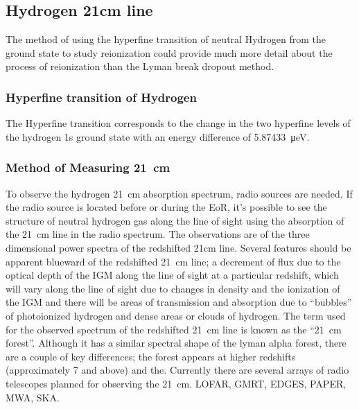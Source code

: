 
    \subsection{Hydrogen 21cm line} %
    \label{sub:Hydrogen_21cm}
        The method of using the hyperfine transition of neutral Hydrogen from the ground state to study reionization could provide much more detail about the process of reionization than the Lyman break dropout method.

         \subsubsection{Hyperfine transition of Hydrogen} %
         \label{subsub:Hyperfine_Hydrogen}
            The Hyperfine transition corresponds to the change in the two hyperfine levels of the hydrogen 1s ground state with an energy difference of \SI{5.87433}{\micro\electronvolt}.

        \subsubsection{Method of Measuring \SI{21}{\centi\metre}} %
    	\label{subsub:Measuring_21cm}
            To observe the hydrogen \SI{21}{\centi\metre} absorption spectrum, radio sources are needed. If the radio source is located before or during the EoR, it's possible to see the structure of neutral hydrogen gas along the line of sight using the absorption of the \SI{21}{\centi\metre} line in the radio spectrum. The observations are of the three dimensional power spectra of the redshifted  21cm line\cite{Liu}. Several features should be apparent blueward of the redshifted \SI{21}{\centi\metre} line; a decrement of flux due to the optical depth of the IGM along the line of sight at a particular redshift, which will vary along the line of sight due to changes in density and the ionization of the IGM and there will be areas of transmission and absorption due to ``bubbles'' of photoionized hydrogen and dense areas or clouds of hydrogen. The term used for the observed spectrum of the redshifted \SI{21}{\centi\metre} line is known as the ``\SI{21}{\centi\metre} forest''. Although it has a similar spectral shape of the lyman alpha forest, there are a couple of key differences; the forest appears at higher redshifts (approximately 7 and above) and the. Currently there are several arrays of radio telescopes planned for observing the \SI{21}{\centi\metre}. LOFAR, GMRT, EDGES, PAPER, MWA, SKA.

